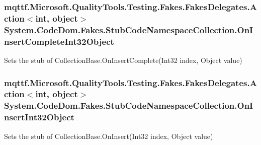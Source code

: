 \hypertarget{class_system_1_1_code_dom_1_1_fakes_1_1_stub_code_namespace_collection_a1aba9ddfa929ab7f36e2e5799377eecb}{
\subsubsection[{On\-Insert\-Complete\-Int32\-Object}]{\setlength{\rightskip}{0pt plus 5cm}mqttf.\-Microsoft.\-Quality\-Tools.\-Testing.\-Fakes.\-Fakes\-Delegates.\-Action$<$int, object$>$ System.\-Code\-Dom.\-Fakes.\-Stub\-Code\-Namespace\-Collection.\-On\-Insert\-Complete\-Int32\-Object}}\label{class_system_1_1_code_dom_1_1_fakes_1_1_stub_code_namespace_collection_a1aba9ddfa929ab7f36e2e5799377eecb}


Sets the stub of Collection\-Base.\-On\-Insert\-Complete(\-Int32 index, Object value)

\hypertarget{class_system_1_1_code_dom_1_1_fakes_1_1_stub_code_namespace_collection_a9ce7ef64fa7160355197df293880a92f}{
\subsubsection[{On\-Insert\-Int32\-Object}]{\setlength{\rightskip}{0pt plus 5cm}mqttf.\-Microsoft.\-Quality\-Tools.\-Testing.\-Fakes.\-Fakes\-Delegates.\-Action$<$int, object$>$ System.\-Code\-Dom.\-Fakes.\-Stub\-Code\-Namespace\-Collection.\-On\-Insert\-Int32\-Object}}\label{class_system_1_1_code_dom_1_1_fakes_1_1_stub_code_namespace_collection_a9ce7ef64fa7160355197df293880a92f}


Sets the stub of Collection\-Base.\-On\-Insert(\-Int32 index, Object value)

